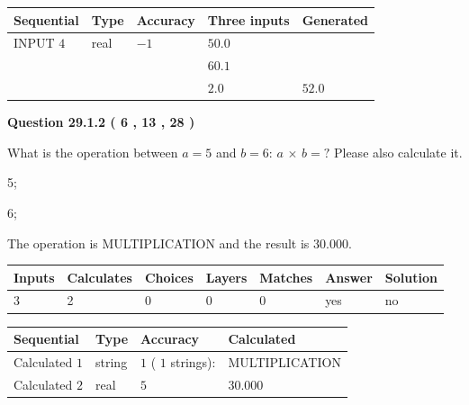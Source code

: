 \documentclass[12pt]{article}
\begin{document}
   
  
  
\noindent\begin{tabular}{|l|l|l|l|l|}
\hline
 Sequential & Type & Accuracy & Three inputs & Generated \\ 
\hline
 
 
  INPUT $            4 $ & real & $           -1  $ & $
 50.0
  $ & \\
  & & &  $
 60.1
  $ & \\
  & & &  $
 2.0
 $ & $ 52.0 $ 
 \\  \hline  
 \end{tabular}
   
   
  
\vspace{0.2in}
  
{\textbf{\Large{Question
29.1.2 
 (           6 ,          13 ,          28 )
}}}
  
  
What is the operation between $a= %
5$ and $b= %
6$:
$a$  %
$\times$ $b=?$ Please also calculate it.
 
 
\noindent{}
 
 

5;
 
6;
 
The operation is  %
MULTIPLICATION and the result is
$ %
30.000$.
 
 
 
\noindent{}
 
 

 
\vspace{0.3in}
   
   
   
   
\noindent\begin{tabular}{|l|l|l|l|l|l|l|}
 \hline
Inputs & Calculates & Choices & Layers & Matches & Answer & Solution \\ \hline
           3  & 
           2  & 
           0
  & 
           0  & 
           0  & 
  yes & 
  no 
  \\ \hline
 \end{tabular}
   
   
   
   
\noindent{}
   
   
  
  
\noindent\begin{tabular}{|l|l|l|l|}
\hline
 Sequential & Type & Accuracy & Calculated \\ 
\hline
 
 
  Calculated $            1 $ & string & $            1  $ ( $           1  $ strings): 
 & MULTIPLICATION
 \\  \hline  
 
 
  Calculated $            2 $ & real & $            5  $ & 
 $ 30.000 $ 
 \\  \hline  
 \end{tabular}
   
\end{document}
